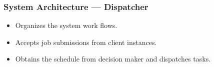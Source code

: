 \begin{frame}
  \frametitle{System Architecture --- Dispatcher}
  \begin{itemize}
    \item Organizes the system work flows.
    \item Accepts job submissions from client instances.
    \item Obtains the schedule from decision maker and dispatches
      tasks.
  \end{itemize}
\end{frame}

